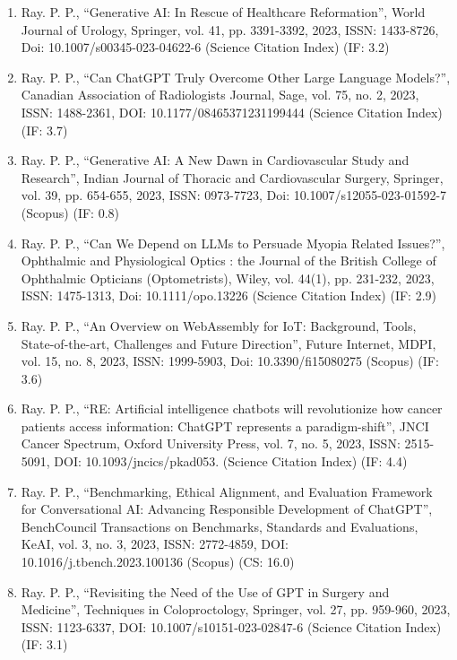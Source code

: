 \documentclass[11pt,a4paper]{moderncv}
\begin{document}
\begin{adjustwidth}{6em}{0pt}
\begin{enumerate}
		\item Ray. P. P., “Generative AI: In Rescue of Healthcare Reformation”, World Journal of Urology, Springer, vol. 41, pp. 3391-3392, 2023, ISSN: 1433-8726, Doi: 10.1007/s00345-023-04622-6 (Science Citation Index) (IF: 3.2)
		
		\item Ray. P. P., “Can ChatGPT Truly Overcome Other Large Language Models?”, Canadian Association of Radiologists Journal, Sage, vol. 75, no. 2, 2023, ISSN: 1488-2361, DOI: 10.1177/08465371231199444 (Science Citation Index) (IF: 3.7)
		
		\item Ray. P. P., “Generative AI: A New Dawn in Cardiovascular Study and Research”, Indian Journal of Thoracic and Cardiovascular Surgery, Springer, vol. 39, pp. 654-655, 2023, ISSN: 0973-7723, Doi: 10.1007/s12055-023-01592-7 (Scopus) (IF: 0.8)
		
		\item Ray. P. P., “Can We Depend on LLMs to Persuade Myopia Related Issues?”, Ophthalmic and Physiological Optics : the Journal of the British College of Ophthalmic Opticians (Optometrists), Wiley, vol. 44(1), pp. 231-232, 2023, ISSN: 1475-1313, Doi: 10.1111/opo.13226 (Science Citation Index) (IF: 2.9)
		
		\item Ray. P. P., “An Overview on WebAssembly for IoT: Background, Tools, State-of-the-art, Challenges and Future Direction”, Future Internet, MDPI, vol. 15, no. 8, 2023, ISSN: 1999-5903, Doi: 10.3390/fi15080275 (Scopus) (IF: 3.6)
		
		\item Ray. P. P., “RE: Artificial intelligence chatbots will revolutionize how cancer patients access information: ChatGPT represents a paradigm-shift”, JNCI Cancer Spectrum, Oxford University Press, vol. 7, no. 5, 2023, ISSN: 2515-5091, DOI: 10.1093/jncics/pkad053. (Science Citation Index) (IF: 4.4)
		
		\item Ray. P. P., “Benchmarking, Ethical Alignment, and Evaluation Framework for Conversational AI: Advancing Responsible Development of ChatGPT”, BenchCouncil Transactions on Benchmarks, Standards and Evaluations, KeAI, vol. 3, no. 3, 2023, ISSN: 2772-4859, DOI: 10.1016/j.tbench.2023.100136 (Scopus) (CS: 16.0)
		
		\item Ray. P. P., “Revisiting the Need of the Use of GPT in Surgery and Medicine”, Techniques in Coloproctology, Springer, vol. 27, pp. 959-960, 2023, ISSN: 1123-6337, DOI: 10.1007/s10151-023-02847-6 (Science Citation Index) (IF: 3.1)
		

\end{enumerate}
\end{adjustwidth}
\end{document}
